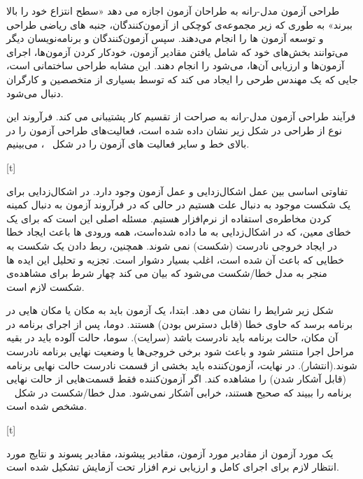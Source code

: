 طراحی آزمون مدل-رانه به طراحان آزمون اجازه می دهد «سطح انتزاع خود را بالا ببرند» به طوری که زیر مجموعه‌ی کوچکی از آزمون‌کنندگان، جنبه های ریاضی طراحی و توسعه آزمون ها را انجام می‌دهند. سپس آزمون‌کنندگان و برنامه‌نویسان دیگر می‌توانند بخش‌های خود که شامل یافتن مقادیر آزمون، خودکار کردن آزمون‌ها، اجرای آزمون‌ها و ارزیابی آن‌ها، می‌شود را انجام ‌دهند. این مشابه طراحی ساختمانی است، جایی که یک مهندس طرحی را ایجاد می کند که توسط بسیاری از متخصصین و کارگران دنبال می‌شود. 

فرآیند طراحی آزمون مدل-رانه به صراحت از تقسیم کار پشتیبانی می کند. فرآروند این نوع از طراحی در شکل زیر نشان داده شده است، فعالیت‌های طراحی آزمون را در بالای خط و سایر فعالیت های آزمون را در شکل ~، می‌بینیم.

[t]
\vspace{0.5em}

تفاوتی اساسی بین عمل اشکال‌زدایی و عمل آزمون وجود دارد. در اشکال‌زدایی برای یک شکست موجود به دنبال علت هستیم در حالی که در فرآروند آزمون به دنبال کمینه کردن مخاطره‌ی استفاده از نرم‌افزار هستیم. مسئله اصلی این است که برای یک خطای معین، که در اشکال‌زدایی به ما داده شده‌است، همه ورودی ها باعث ایجاد خطا در ایجاد خروجی نادرست (شکست) نمی شوند. همچنین، ربط دادن یک شکست به خطایی که باعث آن شده است، اغلب بسیار دشوار است. تجزیه و تحلیل این ایده ها منجر به مدل خطا/شکست می‌شود که بیان می کند چهار شرط برای مشاهده‌ی شکست لازم است.

شکل زیر شرایط را نشان می دهد. ابتدا، یک آزمون باید به مکان یا مکان هایی در برنامه برسد که حاوی خطا (قابل دسترس بودن) هستند. دوما، پس از اجرای برنامه در آن مکان، حالت برنامه باید نادرست باشد (سرایت). سوما، حالت آلوده باید در بقیه مراحل اجرا منتشر شود و باعث شود برخی خروجی‌ها یا وضعیت نهایی برنامه نادرست شوند.(انتشار). در نهایت، آزمون‌کننده باید بخشی از قسمت نادرست حالت نهایی برنامه (قابل آشکار شدن) را مشاهده کند. اگر آزمون‌کننده فقط قسمت‌هایی از حالت نهایی برنامه را ببیند که صحیح هستند، خرابی آشکار نمی‌شود. مدل خطا/شکست در شکل ~ مشخص شده است.

[t]
\vspace{0.5em}

یک مورد آزمون از مقادیر مورد آزمون، مقادیر پیشوند، مقادیر پسوند و نتایج مورد انتظار لازم برای اجرای کامل و ارزیابی نرم افزار تحت آزمایش تشکیل شده است.

